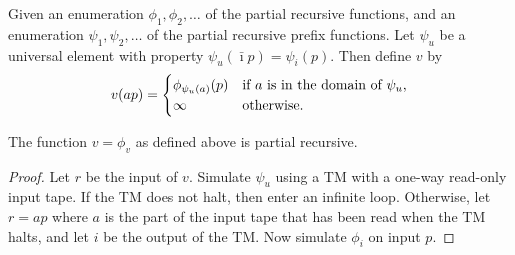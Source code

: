\documentclass{style/llncs}
\newcommand{\tn}[1]{\textnormal{#1}}
\begin{document}
\begin{definition}
Given an enumeration $\phi_1,\phi_2,\ldots$ of the partial recursive functions, and an enumeration $\psi_1,\psi_2,\ldots$ of the partial recursive prefix functions. Let $\psi_u$ be a universal element with property $\psi_u(\bar\imath p)=\psi_i(p)$. Then define $v$ by
\[
v(a p)=\begin{cases}\phi_{\psi_u(a)}(p)&\tn{if $a$ is in the domain of $\psi_u$,}\\
\infty&\tn{otherwise}.\end{cases}
\]
\end{definition}
\begin{lemma}
The function $v=\phi_v$ as defined above is partial recursive.
\end{lemma}
\begin{proof}
Let $r$ be the input of $v$. Simulate $\psi_u$ using a TM with a one-way read-only input tape. If the TM does not halt, then enter an infinite loop. Otherwise, let $r=ap$ where $a$ is the part of the input tape that has been read when the TM halts, and let $i$ be the output of the TM. Now simulate $\phi_i$ on input $p$.
\end{proof}
\end{document}
